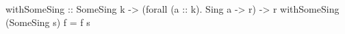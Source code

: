 \begin{code}
withSomeSing
    :: SomeSing k
    -> (forall (a :: k). Sing a -> r)
    -> r
withSomeSing (SomeSing s) f = f s
\end{code}
